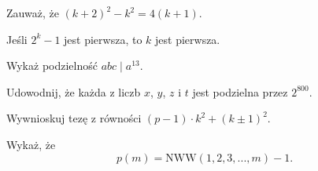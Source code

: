 
\begin{hints_list}
	\item Zauważ, że $(k + 2)^2 - k^2 = 4(k + 1)$. 
	\item Jeśli $2^k - 1$ jest pierwsza, to $k$ jest pierwsza.
	\item Wykaż podzielność $abc \mid a^{13}$.
	\item Udowodnij, że każda z liczb $x$, $y$, $z$ i $t$ jest podzielna przez $2^{800}$.
	\item Wywnioskuj tezę z równości $(p - 1) \cdot k^2 + (k \pm 1)^2$.
	\item Wykaż, że
	\[
		p(m) = \mathrm{NWW}(1, 2, 3, ..., m) - 1.
	\]
\end{hints_list}